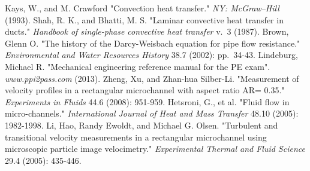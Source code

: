 \documentclass{article} %
\begin{document}
\begin{thebibliography}{9}
		Kays, W., and M. Crawford "Convection heat transfer." \textit{NY: McGraw–Hill} (1993).
		Shah, R. K., and Bhatti, M. S. "Laminar convective heat transfer in ducts." \textit{Handbook of single-phase convective heat transfer} v.~3 (1987).
		Brown, Glenn O. "The history of the Darcy-Weisbach equation for pipe flow resistance." \textit{Environmental and Water Resources History} 38.7 (2002): pp.~34-43.
		Lindeburg, Michael R. "Mechanical engineering reference manual for the PE exam". \textit{www.ppi2pass.com} (2013).
		Zheng, Xu, and Zhan-hua Silber-Li. "Measurement of velocity profiles in a rectangular microchannel with aspect ratio AR= 0.35." \textit{Experiments in Fluids} 44.6 (2008): 951-959.
		Hetsroni, G., et al. "Fluid flow in micro-channels." \textit{International Journal of Heat and Mass Transfer} 48.10 (2005): 1982-1998.
		Li, Hao, Randy Ewoldt, and Michael G. Olsen. "Turbulent and transitional velocity measurements in a rectangular microchannel using microscopic particle image velocimetry." \textit{Experimental Thermal and Fluid Science} 29.4 (2005): 435-446.
\end{thebibliography}

\end{document}
